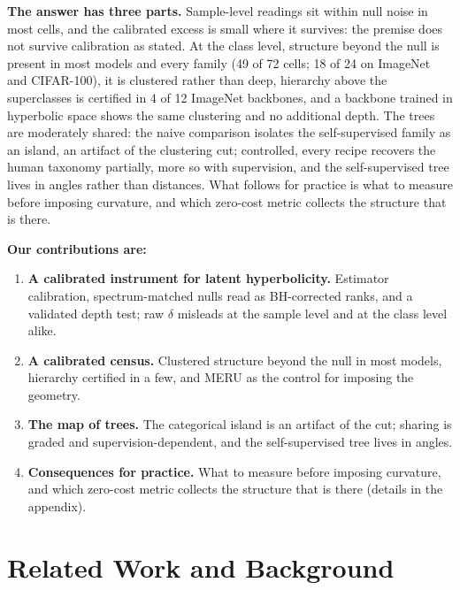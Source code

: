 \textbf{The answer has three parts.} Sample-level readings sit within null noise in most cells, and the calibrated excess is small where it survives: the premise does not survive calibration as stated. At the class level, structure beyond the null is present in most models and every family (49 of 72 cells; 18 of 24 on ImageNet and CIFAR-100), it is clustered rather than deep, hierarchy above the superclasses is certified in 4 of 12 ImageNet backbones, and a backbone trained in hyperbolic space shows the same clustering and no additional depth. The trees are moderately shared: the naive comparison isolates the self-supervised family as an island, an artifact of the clustering cut; controlled, every recipe recovers the human taxonomy partially, more so with supervision, and the self-supervised tree lives in angles rather than distances. What follows for practice is what to measure before imposing curvature, and which zero-cost metric collects the structure that is there. %

\textbf{Our contributions are:}
\begin{enumerate}[topsep=0pt,itemsep=1pt,leftmargin=*]
\item \textbf{A calibrated instrument for latent hyperbolicity.} Estimator calibration, spectrum-matched nulls read as BH-corrected ranks, and a validated depth test; raw $\delta$ misleads at the sample level and at the class level alike.
\item \textbf{A calibrated census.} Clustered structure beyond the null in most models, hierarchy certified in a few, and MERU as the control for imposing the geometry.
\item \textbf{The map of trees.} The categorical island is an artifact of the cut; sharing is graded and supervision-dependent, and the self-supervised tree lives in angles.
\item \textbf{Consequences for practice.} What to measure before imposing curvature, and which zero-cost metric collects the structure that is there (details in the appendix).
\end{enumerate}


\section{Related Work and Background}
\label{sec:related}

